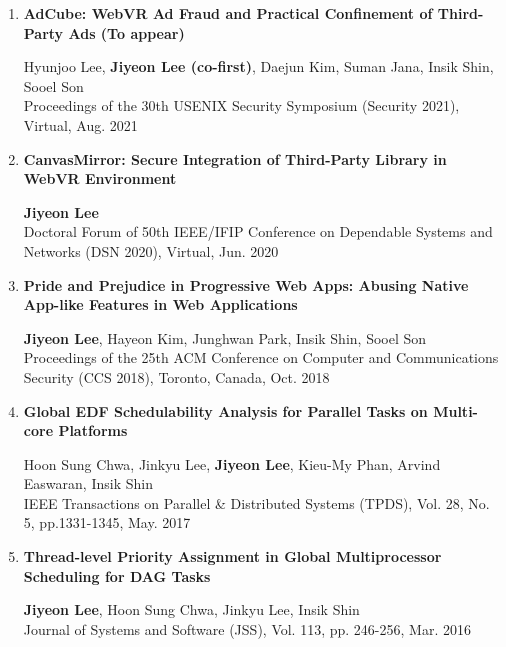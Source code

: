\documentclass[11pt,letterpaper]{article}
\begin{document}
\begin{enumerate}
	\item \textbf{AdCube: WebVR Ad Fraud and Practical Confinement of Third-Party Ads (To appear)} \\
	\begin{small}
		Hyunjoo Lee, \textbf{Jiyeon Lee (co-first)}, Daejun Kim, Suman Jana, Insik Shin, Sooel Son \\ 
		Proceedings of the 30th USENIX Security Symposium (Security 2021), Virtual, Aug. 2021
	\end{small}

	\item \textbf{CanvasMirror: Secure Integration of Third-Party Library in WebVR Environment} \\
	\begin{small}
		\textbf{Jiyeon Lee}\\ 
		Doctoral Forum of 50th IEEE/IFIP Conference on Dependable Systems and Networks (DSN 2020), Virtual, Jun. 2020
	\end{small}

	\item \textbf{Pride and Prejudice in Progressive Web Apps: Abusing Native App-like Features in Web Applications} \\
	\begin{small}
		\textbf{Jiyeon Lee}, Hayeon Kim, Junghwan Park, Insik Shin, Sooel Son\\ 
		Proceedings of the 25th ACM Conference on Computer and Communications Security (CCS 2018), Toronto, Canada, Oct. 2018
	\end{small}

	\item \textbf{Global EDF Schedulability Analysis for Parallel Tasks on Multi-core Platforms} \\
	\begin{small}
		Hoon Sung Chwa, Jinkyu Lee, \textbf{Jiyeon Lee}, Kieu-My Phan, Arvind Easwaran, Insik Shin\\ 
		IEEE Transactions on Parallel \& Distributed Systems (TPDS), Vol. 28, No. 5, pp.1331-1345, May. 2017
	\end{small}

	\item \textbf{Thread-level Priority Assignment in Global Multiprocessor Scheduling for DAG Tasks} \\
	\begin{small}
		\textbf{Jiyeon Lee}, Hoon Sung Chwa, Jinkyu Lee, Insik Shin\\ 
		Journal of Systems and Software (JSS), Vol. 113, pp. 246-256, Mar. 2016
	\end{small}
	

\end{enumerate}
\end{document}
